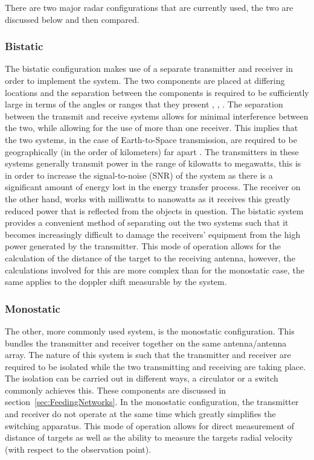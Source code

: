 \documentclass[11pt]{witseiepaper}
\begin{document}
There are two major radar configurations that are currently used, the two are discussed below and then compared.

\subsubsection{Bistatic} \label{sec:Bistatic}

The bistatic configuration makes use of a separate transmitter and receiver in order to implement the system. The two components are placed at differing locations and the separation between the components is required to be sufficiently large in terms of the angles or ranges that they present \cite{OrbitDetermination}, \cite[p.~5]{technicalReportSpaceDebris}, \cite[p.~3]{elevationLoss}. The separation between the transmit and receive systems allows for minimal interference between the two, while allowing for the use of more than one receiver.
This implies that the two systems, in the case of Earth-to-Space transmission, are required to be geographically (in the order of kilometers) far apart \cite{bistaticNato}.
The transmitters in these systems generally transmit power in the range of kilowatts to megawatts, this is in order to increase the signal-to-noise (SNR) of the system as there is a significant amount of energy lost in the energy transfer process. The receiver on the other hand, works with milliwatts to nanowatts as it receives this greatly reduced power that is reflected from the objects in question. The bistatic system provides a convenient method of separating out the two systems such that it becomes increasingly difficult to damage the receivers' equipment from the high power generated by the transmitter.
This mode of operation allows for the calculation of the distance of the target to the receiving antenna, however, the calculations involved for this are more complex than for the monostatic case, the same applies to the doppler shift measurable by the system.

\subsubsection{Monostatic} \label{sec:Monostatic}

The other, more commonly used system, is the monostatic configuration. This bundles the transmitter and receiver together on the same antenna/antenna array. The nature of this system is such that the transmitter and receiver are required to be isolated while the two transmitting and receiving are taking place. The isolation can be carried out in different ways, a circulator or a switch commonly achieves this. These components are discussed in section~\ref{sec:FeedingNetworks}. In the monostatic configuration, the transmitter and receiver do not operate at the same time which greatly simplifies the switching apparatus.
This mode of operation allows for direct measurement of distance of targets as well as the ability to measure the targets radial velocity (with respect to the observation point).
\end{document}
